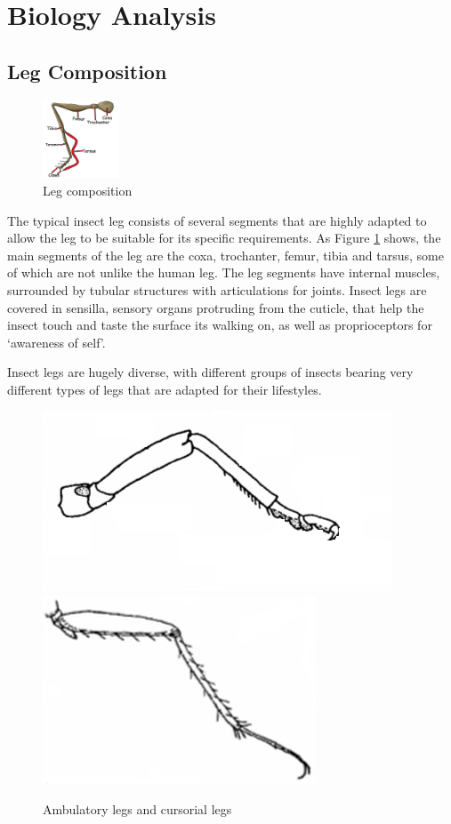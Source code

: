 \documentclass[conference]{IEEEtran}
\begin{document}
\section{Biology Analysis}\label{s2}

\subsection{Leg Composition} 
\begin{figure}
    \centerline{\includegraphics[width=0.2\textwidth]{leg.png}}
    \caption{Leg composition}
    \label{fig8}
\end{figure}

The typical insect leg consists of several segments that are highly adapted to allow the leg to be suitable for its specific requirements. As Figure \ref{fig8} shows, the main segments of the leg are the coxa, trochanter, femur, tibia and tarsus, some of which are not unlike the human leg.\cite{b1} The leg segments have internal muscles, surrounded by tubular structures with articulations for joints. Insect legs are covered in sensilla, sensory organs protruding from the cuticle, that help the insect touch and taste the surface its walking on, as well as proprioceptors for ‘awareness of self’.\cite{b2}

Insect legs are hugely diverse, with different groups of insects bearing very different types of legs that are adapted for their lifestyles.

\begin{figure}
    \centering
    \includegraphics[scale=0.36,align=t]{leg1.png}
    \includegraphics[scale=0.35,align=t]{leg2.jpg}
    \caption{Ambulatory legs and cursorial legs}
    \label{fig9}
\end{figure}
\end{document}
